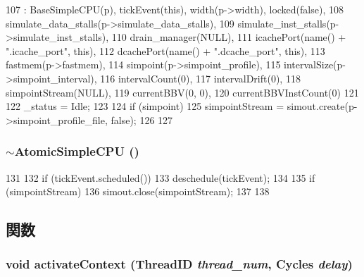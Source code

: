 \begin{DoxyCode}
107     : BaseSimpleCPU(p), tickEvent(this), width(p->width), locked(false),
108       simulate_data_stalls(p->simulate_data_stalls),
109       simulate_inst_stalls(p->simulate_inst_stalls),
110       drain_manager(NULL),
111       icachePort(name() + ".icache_port", this),
112       dcachePort(name() + ".dcache_port", this),
113       fastmem(p->fastmem),
114       simpoint(p->simpoint_profile),
115       intervalSize(p->simpoint_interval),
116       intervalCount(0),
117       intervalDrift(0),
118       simpointStream(NULL),
119       currentBBV(0, 0),
120       currentBBVInstCount(0)
121 {
122     _status = Idle;
123 
124     if (simpoint) {
125         simpointStream = simout.create(p->simpoint_profile_file, false);
126     }
127 }
\end{DoxyCode}
\hypertarget{classAtomicSimpleCPU_a0c1821e85cf304f5a090c51f3460d577}{
\subsubsection[{$\sim$AtomicSimpleCPU}]{\setlength{\rightskip}{0pt plus 5cm}$\sim${\bf AtomicSimpleCPU} ()}}
\label{classAtomicSimpleCPU_a0c1821e85cf304f5a090c51f3460d577}



\begin{DoxyCode}
131 {
132     if (tickEvent.scheduled()) {
133         deschedule(tickEvent);
134     }
135     if (simpointStream) {
136         simout.close(simpointStream);
137     }
138 }
\end{DoxyCode}


\subsection{関数}
\hypertarget{classAtomicSimpleCPU_ad7a501b28bdbe8b3e708cd1ef69ac191}{
\subsubsection[{activateContext}]{\setlength{\rightskip}{0pt plus 5cm}void activateContext ({\bf ThreadID} {\em thread\_\-num}, \/  {\bf Cycles} {\em delay})}}
\label{classAtomicSimpleCPU_ad7a501b28bdbe8b3e708cd1ef69ac191}



